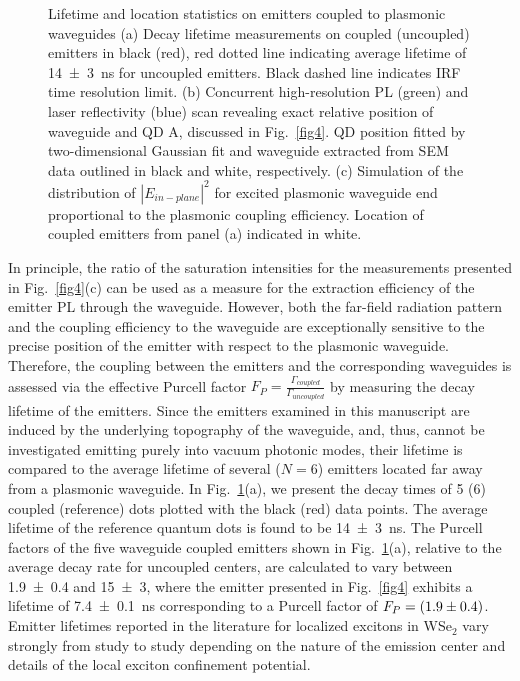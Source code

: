 \documentclass[journal=nalefd,manuscript=letter]{achemso}
\newcommand{\figurescale}{1}
\begin{document}
\begin{figure}[!ht]
\scalebox{\figurescale}{\texttt{[image: fig5.pdf]}}
\renewcommand{\figurename}{Figure}
\caption{\label{fig5}
%
Lifetime and location statistics on emitters coupled to plasmonic waveguides
(a) Decay lifetime measurements on coupled (uncoupled) emitters in black (red), red dotted line indicating average lifetime of \SI{14 \pm 3}{\nano\second} for uncoupled emitters. Black dashed line indicates IRF time resolution limit.
(b) Concurrent high-resolution PL (green) and laser reflectivity (blue) scan revealing exact relative position of waveguide and QD A, discussed in Fig.~\ref{fig4}. QD position fitted by two-dimensional Gaussian fit and waveguide extracted from SEM data outlined in black and white, respectively.
(c) Simulation of the distribution of $|E_{in-plane}|^2$ for excited plasmonic waveguide end proportional to the plasmonic coupling efficiency. Location of coupled emitters from panel (a) indicated in white.
}
\end{figure}

In principle, the ratio of the saturation intensities for the measurements presented in Fig.~\ref{fig4}(c) can be used as a measure for the extraction efficiency of the emitter PL through the waveguide.
However, both the far-field radiation pattern and the coupling efficiency to the waveguide are exceptionally sensitive to the precise position of the emitter with respect to the plasmonic waveguide.
Therefore, the coupling between the emitters and the corresponding waveguides is assessed via the effective Purcell factor $F_P = \frac{\Gamma _{coupled}}{\Gamma _{uncoupled}}$ by measuring the decay lifetime of the emitters.
Since the emitters examined in this manuscript are induced by the underlying topography of the waveguide, and, thus, cannot be investigated emitting purely into vacuum photonic modes, their lifetime is compared to the average lifetime of several ($N=6$) emitters located far away from a plasmonic waveguide.
In Fig.~\ref{fig5}(a), we present the decay times of 5 (6) coupled (reference) dots plotted with the black (red) data points.
The average lifetime of the reference quantum dots is found to be \SI{14 \pm 3}{\nano\second}.
The Purcell factors of the five waveguide coupled emitters shown in Fig.~\ref{fig5}(a), relative to the average decay rate for uncoupled centers, are calculated to vary between \SI{1.9 \pm 0.4}{} and \SI{15 \pm 3}{}, where the emitter presented in Fig.~\ref{fig4} exhibits a lifetime of \SI{7.4 \pm 0.1}{\nano\second} corresponding to a Purcell factor of $F_P = \SI{1.9 \pm 0.4}{}$.
Emitter lifetimes reported in the literature for localized excitons in WSe$_2$ vary strongly from study to study\cite{tripathi.2018} depending on the nature of the emission center and details of the local exciton confinement potential.
\end{document}
